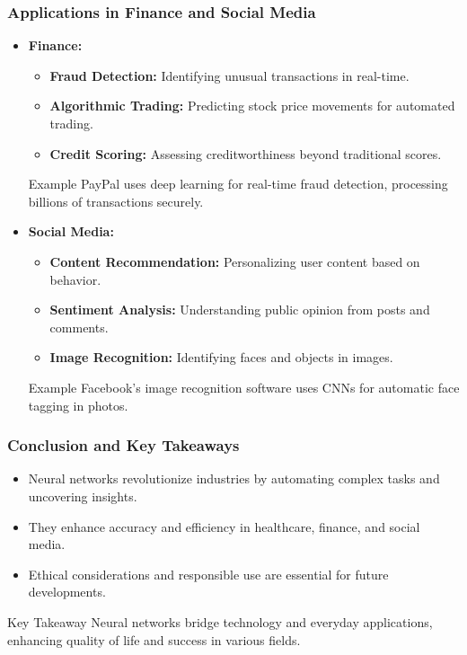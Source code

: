 \documentclass[aspectratio=169]{beamer}
\begin{document}
\begin{frame}[fragile]
    \frametitle{Applications in Finance and Social Media}
    \begin{itemize}
        \item \textbf{Finance:}
        \begin{itemize}
            \item \textbf{Fraud Detection:} Identifying unusual transactions in real-time.
            \item \textbf{Algorithmic Trading:} Predicting stock price movements for automated trading.
            \item \textbf{Credit Scoring:} Assessing creditworthiness beyond traditional scores.
        \end{itemize}
        \begin{block}{Example}
            PayPal uses deep learning for real-time fraud detection, processing billions of transactions securely.
        \end{block}
        
        \item \textbf{Social Media:}
        \begin{itemize}
            \item \textbf{Content Recommendation:} Personalizing user content based on behavior.
            \item \textbf{Sentiment Analysis:} Understanding public opinion from posts and comments.
            \item \textbf{Image Recognition:} Identifying faces and objects in images.
        \end{itemize}
        \begin{block}{Example}
            Facebook’s image recognition software uses CNNs for automatic face tagging in photos.
        \end{block}
    \end{itemize}
\end{frame}

\begin{frame}[fragile]
    \frametitle{Conclusion and Key Takeaways}
    \begin{itemize}
        \item Neural networks revolutionize industries by automating complex tasks and uncovering insights.
        \item They enhance accuracy and efficiency in healthcare, finance, and social media.
        \item Ethical considerations and responsible use are essential for future developments.
    \end{itemize}
    \begin{block}{Key Takeaway}
        Neural networks bridge technology and everyday applications, enhancing quality of life and success in various fields.
    \end{block}
\end{frame}
\end{document}
